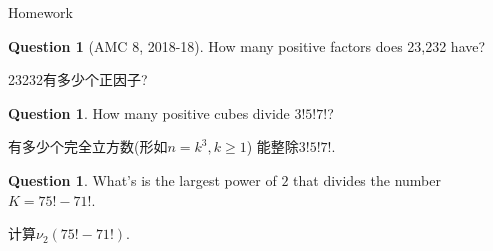 \documentclass{beamer}
\theoremstyle{definition}
\newtheorem{ques}[defn]{Question}
\begin{document}
\begin{frame}{Homework}
    \begin{ques}[AMC 8, 2018-18]
        How many positive factors does 23,232 have?

        23232有多少个正因子?
    \end{ques}
    \begin{ques}
        How many positive cubes divide $3!5!7!$? 

        有多少个完全立方数(形如$n=k^3,k\ge 1$) 能整除$3!5!7!$.
    \end{ques}
    \begin{ques}
        What's is the largest power of $2$ that divides the number $K=75!-71!$.

        计算$\nu_2(75!-71!)$.
    \end{ques}
\end{frame}
\end{document}

